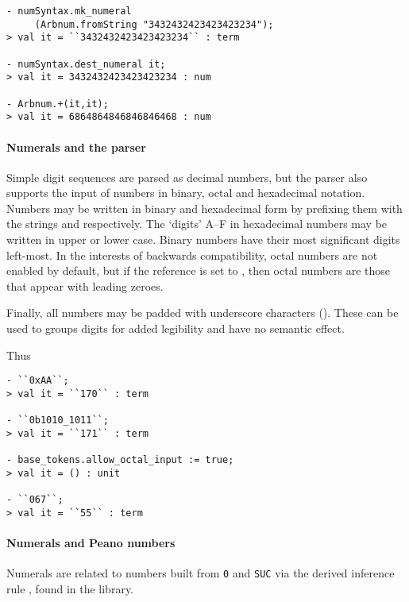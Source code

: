 \begin{boxed}
\begin{verbatim}
- numSyntax.mk_numeral
     (Arbnum.fromString "3432432423423423234");
> val it = ``3432432423423423234`` : term

- numSyntax.dest_numeral it;
> val it = 3432432423423423234 : num

- Arbnum.+(it,it);
> val it = 6864864846846846468 : num
\end{verbatim}
\end{boxed}

\paragraph{Numerals and the parser}
%
%
Simple digit sequences are parsed as decimal numbers, but the parser
also supports the input of numbers in binary, octal and hexadecimal
notation.  Numbers may be written in binary and hexadecimal form by
prefixing them with the strings  and  respectively.  The
`digits' A--F in hexadecimal numbers may be written in upper or lower
case.  Binary numbers have their most significant digits left-most. In
the interests of backwards compatibility, octal numbers are not
enabled by default, but if the reference
 is set to , then octal
numbers are those that appear with leading zeroes.

Finally, all numbers may be padded with underscore characters
(\ml{\_}).  These can be used to groups digits for added legibility
and have no semantic effect.

Thus
\begin{boxed}
\begin{verbatim}
- ``0xAA``;
> val it = ``170`` : term

- ``0b1010_1011``;
> val it = ``171`` : term

- base_tokens.allow_octal_input := true;
> val it = () : unit

- ``067``;
> val it = ``55`` : term
\end{verbatim}
\end{boxed}

\paragraph{Numerals and Peano numbers}

Numerals are related to numbers built from {\small\verb+0+} and
{\small\verb+SUC+} via the derived inference rule
, found in the  library.

